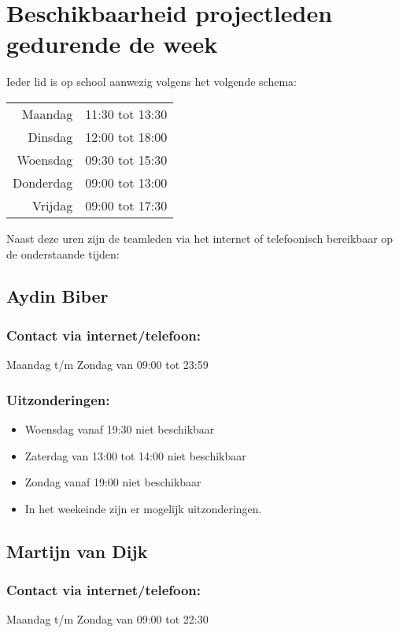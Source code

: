 \documentclass[dutch]{hu}
\begin{document}
\chapter{Beschikbaarheid projectleden gedurende de week}
Ieder lid is op school aanwezig volgens het volgende schema: \newline
\begin{tabular}{ r | l }
Maandag & 11:30 tot 13:30 \\
Dinsdag & 12:00 tot 18:00 \\
Woensdag & 09:30 tot 15:30 \\
Donderdag & 09:00 tot 13:00 \\
Vrijdag & 09:00 tot 17:30 \\
\end{tabular}
\newline \newline
Naast deze uren zijn de teamleden via het internet of telefoonisch bereikbaar op de onderstaande tijden:

\section*{Aydin Biber}
\subsection*{Contact via internet/telefoon:}
Maandag t/m Zondag van 09:00 tot 23:59
\subsection*{Uitzonderingen:}
\begin{itemize}
\item Woensdag vanaf 19:30 niet beschikbaar
\item Zaterdag van 13:00 tot 14:00 niet beschikbaar
\item Zondag vanaf 19:00 niet beschikbaar
\item In het weekeinde zijn er mogelijk uitzonderingen.
\end{itemize}
\newpage

\section*{Martijn van Dijk}
\subsection{Contact via internet/telefoon:}
Maandag t/m Zondag van 09:00 tot 22:30
\end{document}
